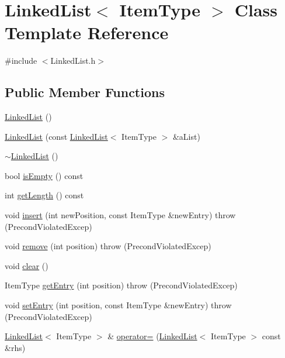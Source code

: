 \hypertarget{classLinkedList}{}\section{Linked\+List$<$ Item\+Type $>$ Class Template Reference}
\label{classLinkedList}


{\ttfamily \#include $<$Linked\+List.\+h$>$}

\subsection*{Public Member Functions}
\begin{DoxyCompactItemize}
\item 
\hyperlink{classLinkedList_adf8d8164e06b6d358a36df7e53e814ee}{Linked\+List} ()
\item 
\hyperlink{classLinkedList_a6f1443c6120352f1f5b6bd3c0d95e41e}{Linked\+List} (const \hyperlink{classLinkedList}{Linked\+List}$<$ Item\+Type $>$ \&a\+List)
\item 
\hyperlink{classLinkedList_a66aee17d756fe0e002375897383c180b}{$\sim$\+Linked\+List} ()
\item 
bool \hyperlink{classLinkedList_adb17aed0ceacbbe1f247d235f491f0d5}{is\+Empty} () const 
\item 
int \hyperlink{classLinkedList_adae55d6b79235c816cb9e05027fd2e7a}{get\+Length} () const 
\item 
void \hyperlink{classLinkedList_ad5b788484a27148957dd32c1ed3dba86}{insert} (int new\+Position, const Item\+Type \&new\+Entry)  throw (\+Precond\+Violated\+Excep)
\item 
void \hyperlink{classLinkedList_a59c21f65c248c285af80fe3dd2592f71}{remove} (int position)  throw (\+Precond\+Violated\+Excep)
\item 
void \hyperlink{classLinkedList_a7d1d9cf83eef67b6c4d700a3cc5970e1}{clear} ()
\item 
Item\+Type \hyperlink{classLinkedList_ada95ab2c24c1fd8f04e3e4da6fd13179}{get\+Entry} (int position)  throw (\+Precond\+Violated\+Excep)
\item 
void \hyperlink{classLinkedList_a20e0c3c3929e857901e2dc4ccc29a0bb}{set\+Entry} (int position, const Item\+Type \&new\+Entry)  throw (\+Precond\+Violated\+Excep)
\item 
\hyperlink{classLinkedList}{Linked\+List}$<$ Item\+Type $>$ \& \hyperlink{classLinkedList_ae11a4490ca20f004dafc75179bc50db4}{operator=} (\hyperlink{classLinkedList}{Linked\+List}$<$ Item\+Type $>$ const \&rhs)
\end{DoxyCompactItemize}
